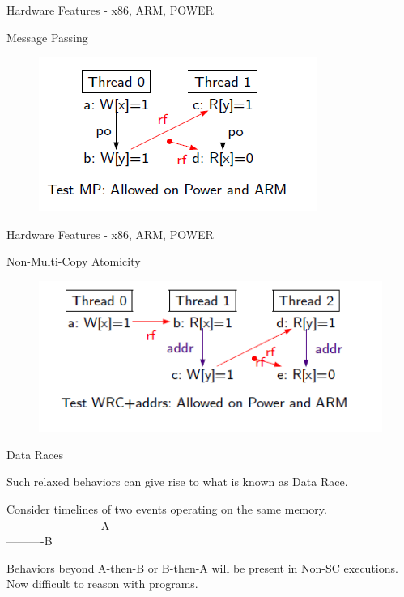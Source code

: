 \documentclass{beamer}
\begin{document}
    \begin{frame}{Hardware Features - x86, ARM, POWER}
        
        Message Passing
        \begin{figure}
            \centering
            \includegraphics[scale=0.7]{MP.PNG}
        \end{figure}
        
    \end{frame}

    \begin{frame}{Hardware Features - x86, ARM, POWER}

        Non-Multi-Copy Atomicity
        \begin{figure}
            \centering
            \includegraphics[scale=0.7]{WRC.PNG}
        \end{figure}

    \end{frame}

    \begin{frame}{Data Races}
        
        Such relaxed behaviors can give rise to what is known as Data Race.

        Consider timelines of two events operating on the same memory.
        \\
        -------------------------A
        \\
        ----------B

        Behaviors beyond A-then-B or B-then-A will be present in Non-SC executions.
        Now difficult to reason with programs. 
        
    \end{frame}
\end{document}
